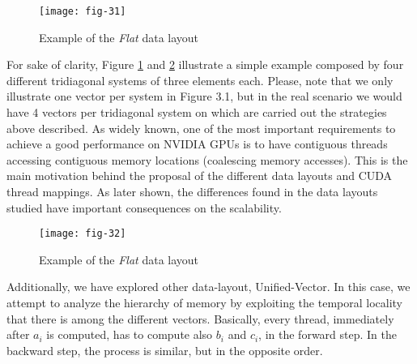 \vspace{5ex}
\begin{figure}[htbp]
    \centering
    \texttt{[image: fig-31]}
    \label{fig:fig-31}
    \caption{Example of the \textit{Flat} data layout}
\end{figure}

For sake of clarity, Figure \ref{fig:fig-31} and \ref{fig:fig-32} illustrate a simple example composed by four
different tridiagonal systems of three elements each. Please, note that we only illustrate
one vector per system in Figure 3.1, but in the real scenario we would have 4 vectors
per tridiagonal system on which are carried out the strategies above described. As
widely known, one of the most important requirements to achieve a good performance
on NVIDIA GPUs is to have contiguous threads accessing contiguous memory locations
(coalescing memory accesses). This is the main motivation behind the proposal of the
different data layouts and CUDA thread mappings. As later shown, the differences
found in the data layouts studied have important consequences on the scalability.

\begin{figure}[htbp]
    \centering
    \texttt{[image: fig-32]}
    \label{fig:fig-32}
    \caption{Example of the \textit{Flat} data layout}
\end{figure}

Additionally, we have explored other data-layout, Unified-Vector. In this case, we
attempt to analyze the hierarchy of memory by exploiting the temporal locality that
there is among the different vectors. Basically, every
thread, immediately after $a_i$ is computed, has to compute also 
$b_i$ and $c_i$, in the forward step. In the backward step, the process
is similar, but in the opposite order.










